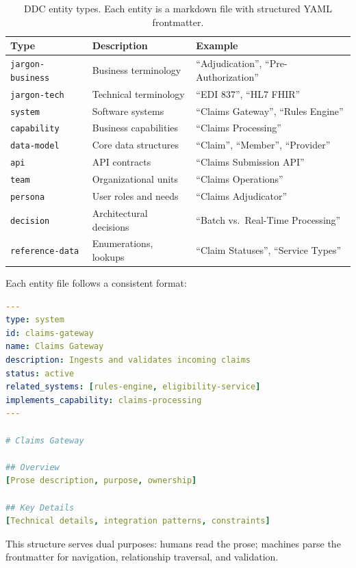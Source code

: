 \documentclass[11pt,a4paper]{article}
\begin{document}
\begin{table}[h]
\centering
\caption{DDC entity types. Each entity is a markdown file with structured YAML frontmatter.}
\label{tab:entity-types}
\begin{tabular}{@{}llp{4.5cm}@{}}
\toprule
\textbf{Type} & \textbf{Description} & \textbf{Example} \\
\midrule
\texttt{jargon-business} & Business terminology & ``Adjudication'', ``Pre-Authorization'' \\
\texttt{jargon-tech} & Technical terminology & ``EDI 837'', ``HL7 FHIR'' \\
\texttt{system} & Software systems & ``Claims Gateway'', ``Rules Engine'' \\
\texttt{capability} & Business capabilities & ``Claims Processing'' \\
\texttt{data-model} & Core data structures & ``Claim'', ``Member'', ``Provider'' \\
\texttt{api} & API contracts & ``Claims Submission API'' \\
\texttt{team} & Organizational units & ``Claims Operations'' \\
\texttt{persona} & User roles and needs & ``Claims Adjudicator'' \\
\texttt{decision} & Architectural decisions & ``Batch vs.\ Real-Time Processing'' \\
\texttt{reference-data} & Enumerations, lookups & ``Claim Statuses'', ``Service Types'' \\
\bottomrule
\end{tabular}
\end{table}

Each entity file follows a consistent format:

\begin{lstlisting}[language=yaml,caption={Entity file format with YAML frontmatter and markdown body.}]
---
type: system
id: claims-gateway
name: Claims Gateway
description: Ingests and validates incoming claims
status: active
related_systems: [rules-engine, eligibility-service]
implements_capability: claims-processing
---

# Claims Gateway

## Overview
[Prose description, purpose, ownership]

## Key Details
[Technical details, integration patterns, constraints]
\end{lstlisting}

This structure serves dual purposes: humans read the prose; machines parse the frontmatter for navigation, relationship traversal, and validation.
\end{document}
